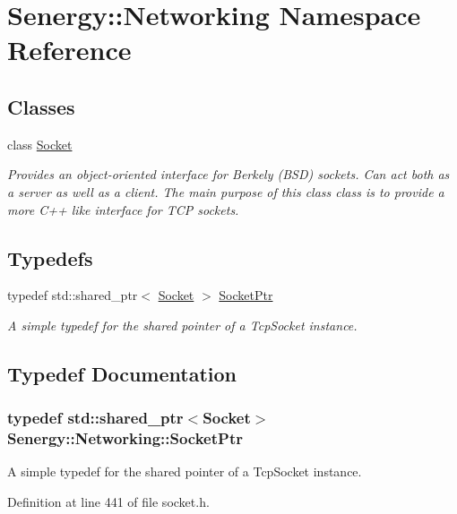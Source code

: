 \hypertarget{namespace_senergy_1_1_networking}{\section{Senergy\-:\-:Networking Namespace Reference}
\label{namespace_senergy_1_1_networking}
}
\subsection*{Classes}
\begin{DoxyCompactItemize}
\item 
class \hyperlink{class_senergy_1_1_networking_1_1_socket}{Socket}
\begin{DoxyCompactList}\small\item\em Provides an object-\/oriented interface for Berkely (B\-S\-D) sockets. Can act both as a server as well as a client. The main purpose of this class class is to provide a more C++ like interface for T\-C\-P sockets. \end{DoxyCompactList}\end{DoxyCompactItemize}
\subsection*{Typedefs}
\begin{DoxyCompactItemize}
\item 
typedef std\-::shared\-\_\-ptr$<$ \hyperlink{class_senergy_1_1_networking_1_1_socket}{Socket} $>$ \hyperlink{namespace_senergy_1_1_networking_aced57616d1b0ede6535865d5909abaf1}{Socket\-Ptr}
\begin{DoxyCompactList}\small\item\em A simple typedef for the shared pointer of a Tcp\-Socket instance. \end{DoxyCompactList}\end{DoxyCompactItemize}


\subsection{Typedef Documentation}
\hypertarget{namespace_senergy_1_1_networking_aced57616d1b0ede6535865d5909abaf1}{
\subsubsection[{Socket\-Ptr}]{\setlength{\rightskip}{0pt plus 5cm}typedef std\-::shared\-\_\-ptr$<${\bf Socket}$>$ {\bf Senergy\-::\-Networking\-::\-Socket\-Ptr}}}\label{namespace_senergy_1_1_networking_aced57616d1b0ede6535865d5909abaf1}


A simple typedef for the shared pointer of a Tcp\-Socket instance. 



Definition at line 441 of file socket.\-h.

